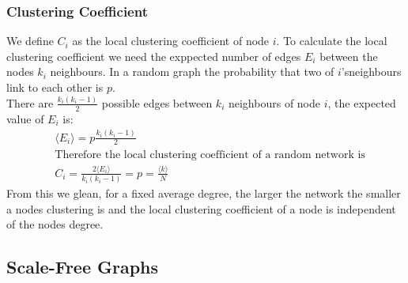 \documentclass{article}
\begin{document}
            \subsubsection{Clustering Coefficient}
            We define $C_i$ as the local clustering coefficient of node $i$. To calculate the local clustering coefficient we need the exppected number of edges $E_i$ between the nodes $k_i$ neighbours. In a random graph the probability that two of $i$'sneighbours link to each other is $p$.\\ There are $\frac{k_{i}(k_{i}-1)}{2}$ possible edges between $k_i$ neighbours of node $i$, the expected value of $E_i$ is:
            \begin{align*}
                &\langle E_i \rangle = p\frac{k_{i}(k_{i}-1)}{2}\\
                &\text{Therefore the local clustering coefficient of a random network is}\\
                &C_i = \frac{2\langle E_i \rangle}{k_{i}(k_{i}-1)} = p = \frac{\langle k \rangle}{N}
            \end{align*} 
            From this we glean, for a fixed average degree, the larger the network the smaller a nodes clustering is and the local clustering coefficient of a node is independent of the nodes degree.
        \subsection{Scale-Free Graphs}
\end{document}
